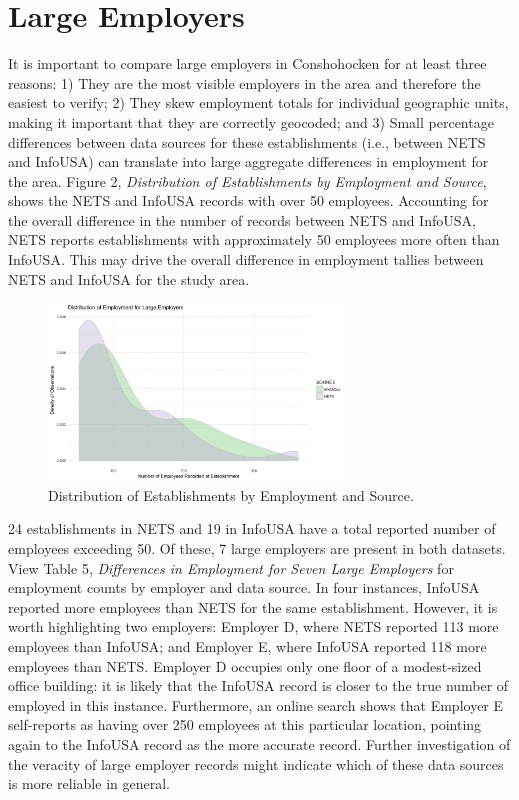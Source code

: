 \documentclass[paper = letter, fontsize = 11pt]{scrartcl}
\begin{document}
\section{Large Employers}
It is important to compare large employers in Conshohocken for at least three reasons: 1) They are the most visible employers in the area and therefore the easiest to verify; 2) They skew employment totals for individual geographic units, making it important that they are correctly geocoded; and 3) Small percentage differences between data sources for these establishments (i.e., between NETS and InfoUSA) can translate into large aggregate differences in employment for the area. Figure 2, \textit{Distribution of Establishments by Employment and Source}, shows the NETS and InfoUSA records with over 50 employees. Accounting for the overall difference in the number of records between NETS and InfoUSA, NETS reports establishments with approximately 50 employees more often than InfoUSA. This may drive the overall difference in employment tallies between NETS and InfoUSA for the study area.\par
\begin{figure}[h]
	\centering
	\includegraphics[width = 0.7\textwidth]{densityLgEmp}
	\caption{Distribution of Establishments by Employment and Source.}
\end{figure}
24 establishments in NETS and 19 in InfoUSA have a total reported number of employees exceeding 50. Of these, 7 large employers are present in both datasets. View Table 5, \textit{Differences in Employment for Seven Large Employers} for employment counts by employer and data source. In four instances, InfoUSA reported more employees than NETS for the same establishment. However, it is worth highlighting two employers: Employer D, where NETS reported 113 more employees than InfoUSA; and Employer E, where InfoUSA reported 118 more employees than NETS. Employer D occupies only one floor of a modest-sized office building: it is likely that the InfoUSA record is closer to the true number of employed in this instance. Furthermore, an online search shows that Employer E self-reports as having over 250 employees at this particular location, pointing again to the InfoUSA record as the more accurate record. Further investigation of the veracity of large employer records might indicate which of these data sources is more reliable in general.
\end{document}
